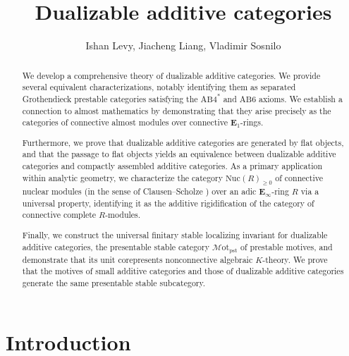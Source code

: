 \documentclass[a4paper,10pt, oneside]{amsart}
\begin{document}
		\let\mathbb=\mathbf
	
	\title{Dualizable additive categories}
	\author{Ishan Levy, Jiacheng Liang, Vladimir Sosnilo}
	
	
	
	
	
	\maketitle

	

	
\vspace{-1.5em}
	
	\begin{abstract}
	We develop a comprehensive theory of dualizable additive categories. We provide several equivalent characterizations, notably identifying them as separated Grothendieck prestable categories satisfying the $\mathrm{AB4}^*$ and $\mathrm{AB6}$ axioms. We establish a connection to almost mathematics by demonstrating that they arise precisely as the categories of connective almost modules over connective $\mathbb{E}_1$-rings. 
	
	Furthermore, we prove that dualizable additive categories are generated by flat objects, and that the passage to flat objects yields an equivalence between dualizable additive categories and compactly assembled additive categories. As a primary application within analytic geometry, we characterize the category $\mathrm{Nuc}(R)_{\geq0}$ of connective nuclear modules (in the sense of Clausen--Scholze \cite{scholze2026lecturesanalyticgeometry}) over an adic $\mathbb{E}_\infty$-ring $R$ via a universal property, identifying it as the additive rigidification of the category of connective complete $R$-modules.
	
	Finally, we construct the universal finitary stable localizing invariant for dualizable additive categories, the presentable stable category $\mathcal{M}\mathrm{ot}_{\mathrm{pst}}$ of prestable motives, and demonstrate that its unit corepresents nonconnective algebraic $K$-theory. We prove that the motives of small additive categories and those of dualizable additive categories generate the same presentable stable subcategory.
	\end{abstract}
		\tableofcontents
	

	\section*{Introduction}
\end{document}
